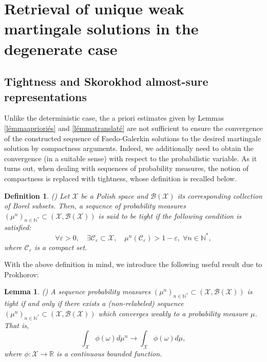 \documentclass[10pt,number,preprint,times]{elsarticle}
\numberwithin{equation}{section} %
\newtheorem{defi}{Definition}[section]
\newtheorem{lem}{Lemma}[section]
\begin{document}
\section{Retrieval of unique weak martingale solutions in the degenerate case}\label{section7}

\subsection{Tightness and Skorokhod almost-sure representations}\label{section5}
Unlike the deterministic case, the a priori estimates given by Lemmas  \ref{lémmaaprioriés}  and \ref{lémmatranslaté} are not sufficient to ensure the convergence of the constructed sequence of Faedo-Galerkin solutions to the desired martingale solution by compactness arguments. Indeed, we additionally need to obtain the convergence (in a suitable sense) with respect to the probabilistic variable. As it turns out, when dealing with sequences of probability measures, the notion of compactness is replaced with tightness, whose definition is recalled below.
\begin{defi}(\cite[p. 32]{da2014stochastic})
	Let $\mathscr{X}$ be a Polish space and $\mathcal{B}(\mathscr{X})$ its corresponding collection of Borel subsets. Then, a sequence of probability measures $\left(\mu^n \right)_{n \in \mathbb{N}^*} \subset \left(\mathscr{X},\mathcal{B}(\mathscr{X})\right)$ is said to be tight if the following condition is satisfied: 
	$$
	\forall \varepsilon>0, \quad \exists \mathscr{C}_\varepsilon \subset \mathscr{X}, \quad \mu^n\left(\mathscr{C}_\varepsilon\right)>1-\varepsilon,\; \forall n \in \mathbb{N}^*,
	$$
	where $\mathscr{C}_\varepsilon$ is a compact set.
\end{defi}
\noindent
With the above definition in mind, we introduce the following useful result due to Prokhorov:
\begin{lem}(\cite[Theorem 2.3]{da2014stochastic})
	\label{prokhorow}
	A sequence probability measures $\left(\mu^n\right)_{n \in \mathbb{N}^*} \subset \left(\mathscr{X},\mathcal{B}(\mathscr{X})\right)$ is tight if and only if there exists a (non-relabeled) sequence $\left(\mu^n\right)_{n \in \mathbb{N}^*} \subset \left(\mathscr{X},\mathcal{B}(\mathscr{X})\right)$ which converges weakly to a probability measure $\mu$. That is, 
	$$
	\int_{\mathscr{X}} \phi(\omega) d\mu^n \rightarrow \int_{\mathscr{X}} \phi(\omega) d\mu,
	$$
	where $\phi : \mathscr{X} \rightarrow \mathbb{R}$ is a continuous bounded function. 
\end{lem}
\end{document}
